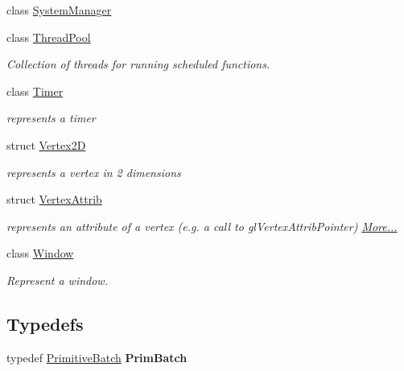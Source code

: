 \begin{DoxyCompactItemize}
class \hyperlink{classnta_1_1SystemManager}{System\+Manager}
\item 
class \hyperlink{classnta_1_1ThreadPool}{Thread\+Pool}
\begin{DoxyCompactList}\small\item\em Collection of threads for running scheduled functions. \end{DoxyCompactList}\item 
class \hyperlink{classnta_1_1Timer}{Timer}
\begin{DoxyCompactList}\small\item\em represents a timer \end{DoxyCompactList}\item 
struct \hyperlink{structnta_1_1Vertex2D}{Vertex2D}
\begin{DoxyCompactList}\small\item\em represents a vertex in 2 dimensions \end{DoxyCompactList}\item 
struct \hyperlink{namespacenta_df/d9d/structnta_1_1VertexAttrib}{Vertex\+Attrib}
\begin{DoxyCompactList}\small\item\em represents an attribute of a vertex (e.\+g. a call to gl\+Vertex\+Attrib\+Pointer)  \hyperlink{namespacenta_df/d9d/structnta_1_1VertexAttrib}{More...}\end{DoxyCompactList}\item 
class \hyperlink{classnta_1_1Window}{Window}
\begin{DoxyCompactList}\small\item\em Represent a window. \end{DoxyCompactList}\end{DoxyCompactItemize}
\subsection*{Typedefs}
\begin{DoxyCompactItemize}
\item 
\mbox{\label{namespacenta_acee44e1bbf4f2431ec51a26e231691e5}} 
typedef \hyperlink{classnta_1_1PrimitiveBatch}{Primitive\+Batch} {\bfseries Prim\+Batch}
\end{DoxyCompactItemize}
